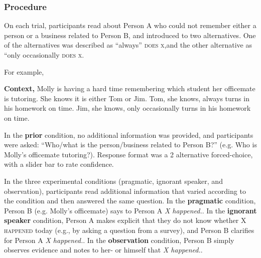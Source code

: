 \documentclass[10pt,letterpaper]{article}
\begin{document}
\subsubsection{Procedure}

On each trial, participants read about Person A who could not remember either a person or a business related to Person B, and introduced to two alternatives. 
One of the alternatives was described as ``always'' \textsc{does x},and the other alternative as ``only occasionally \textsc{does x}. 

For example,

\textbf{Context,} Molly is having a hard time remembering which student her officemate is tutoring.  
She knows it is either Tom or Jim. 
Tom, she knows, always turns in his homework on time.  
Jim, she knows, only occasionally turns in his homework on time.

In the \textbf{prior} condition, no additional information was provided, and participants were asked: ``Who/what is the person/business related to Person B?'' (e.g. Who is Molly's officemate tutoring?).  Response format was a 2 alternative forced-choice, with a slider bar to rate confidence.

In the three experimental conditions (pragmatic, ignorant speaker, and observation), participants read additional information that varied according to the condition and then answered the same question.
In the \textbf{pragmatic} condition,  Person B (e.g. Molly's officemate) says to Person A \emph{X happened.}. 
In the \textbf{ignorant speaker} condition, Person A makes explicit that they do not know whether \textsc{X happened} today (e.g., by asking a question from a survey), and Person B clarifies for Person A \emph{X happened.}.
In the \textbf{observation} condition, Person B simply observes evidence and notes to her- or himself that \emph{X happened.}.
\end{document}
